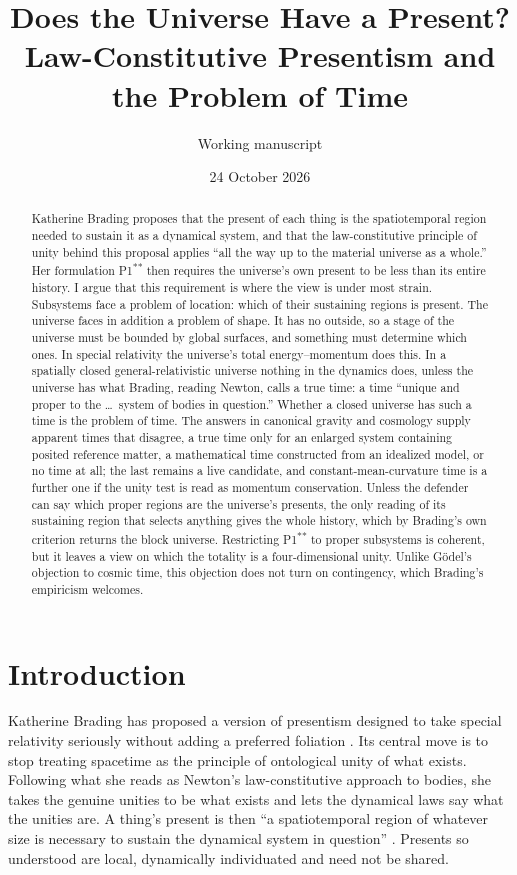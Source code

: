 \documentclass[11pt]{article}
\title{Does the Universe Have a Present?\\[2pt]
\large Law-Constitutive Presentism and the Problem of Time}
\author{Working manuscript}
\date{24 October 2026}
\begin{document}
\maketitle

\begin{abstract}
Katherine Brading proposes that the present of each thing is the
spatiotemporal region needed to sustain it as a dynamical system, and that
the law-constitutive principle of unity behind this proposal applies ``all
the way up to the material universe as a whole.'' Her formulation
P1\textsuperscript{**} then requires the universe's own present to be less
than its entire history. I argue that this requirement is where the view is
under most strain. Subsystems face a problem of location: which of their
sustaining regions is present. The universe faces in addition a problem of
shape. It has no outside, so a stage of the universe must be bounded by
global surfaces, and something must determine which ones. In special
relativity the universe's total energy--momentum does this. In a spatially
closed general-relativistic universe nothing in the dynamics does, unless
the universe has what Brading, reading Newton, calls a true time: a time
``unique and proper to the \ldots\ system of bodies in question.'' Whether a
closed universe has such a time is the problem of time. The answers in
canonical gravity and cosmology supply apparent times that disagree, a true
time only for an enlarged system containing posited reference matter, a
mathematical time constructed from an idealized model, or no time at all;
the last remains a live candidate, and constant-mean-curvature time is a
further one if the unity test is read as momentum conservation. Unless the
defender can say which proper regions are the universe's presents, the only
reading of its sustaining region that selects anything gives the whole
history, which by Brading's own criterion returns the block universe.
Restricting P1\textsuperscript{**} to proper subsystems is
coherent, but it leaves a view on which the totality is a four-dimensional
unity. Unlike Gödel's objection to cosmic time, this objection does not turn
on contingency, which Brading's empiricism welcomes.
\end{abstract}

\section{Introduction}\label{sec:intro}

Katherine Brading has proposed a version of presentism designed to take
special relativity seriously without adding a preferred foliation
\citep{Brading2013,Brading2015}. Its central move is to stop treating
spacetime as the principle of ontological unity of what exists. Following
what she reads as Newton's law-constitutive approach to bodies, she takes
the genuine unities to be what exists and lets the dynamical laws say what
the unities are. A thing's present is then ``a spatiotemporal region of
whatever size is necessary to sustain the dynamical system in question''
\citep[p.~1109]{Brading2013}. Presents so understood are local, dynamically
individuated and need not be shared.
\end{document}
